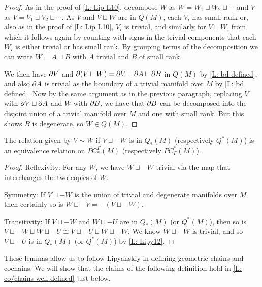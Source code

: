\begin{proof}
As in the proof of \cref{L: Lip L10}, decompose $W$ as $W = W_1 \sqcup W_2 \sqcup \cdots$ and $V$ as $V = V_1 \sqcup V_2 \sqcup \cdots$. As $V$ and $V \sqcup W$ are in $Q(M)$, each $V_i$ has small rank or, also as in the proof of \cref{L: Lip L10}, $V_i$ is trivial, and similarly for $V \sqcup W$, from which it follows again by counting with signs in the trivial components that each $W_i$ is either trivial or has small rank.
By grouping terms of the decomposition we can write $W = A \sqcup B$ with $A$ trivial and $B$ of small rank.

We then have $\partial V$ and $\partial (V \sqcup W) = \partial V \sqcup \partial A \sqcup \partial B$ in $Q(M)$ by \cref{L: bd defined}, and also $\partial A$ is trivial as the boundary of a trivial manifold over $M$ by \cref{L: bd defined}. Now by the same argument as in the previous paragraph, replacing $V$ with $\partial V \sqcup \partial A$ and $W$ with $\partial B$, we have that $\partial B$ can be decomposed into the disjoint union of a trivial manifold over $M$ and one with small rank. But this shows $B$ is degenerate, so $W \in Q(M)$.
\end{proof}

\begin{lemma}\label{L: cancel Q}
The relation given by $V\sim W$ if $V \sqcup -W$ is in $Q_*(M)$ (respectively $Q^*(M)$) is an equivalence relation on $PC^\Gamma_*(M)$ (respectively $PC_\Gamma^*(M)$).
\end{lemma}
\begin{proof}
Reflexivity: For any $W$, we have $W \sqcup -W$ trivial via the map that interchanges the two copies of $W$.

Symmetry: If $V \sqcup -W$ is the union of trivial and degenerate manifolds over $M$ then certainly so is $W \sqcup -V = -(V \sqcup -W)$.

Transitivity: If $V \sqcup -W$ and $W \sqcup -U$ are in $Q_*(M)$ (or $Q^*(M)$), then so is $V \sqcup -W \sqcup W \sqcup -U \cong V \sqcup -U \sqcup W \sqcup -W$. We know $W \sqcup -W$ is trivial, and so $V \sqcup -U$ is in $Q_*(M)$ (or $Q^*(M)$) by \cref{L: Lipy12}.
\end{proof}





These lemmas allow us to follow Lipyanskiy in defining geometric chains and cochains. We will show that the claims of the following definition hold in \cref{L: co/chains well defined} just below.


